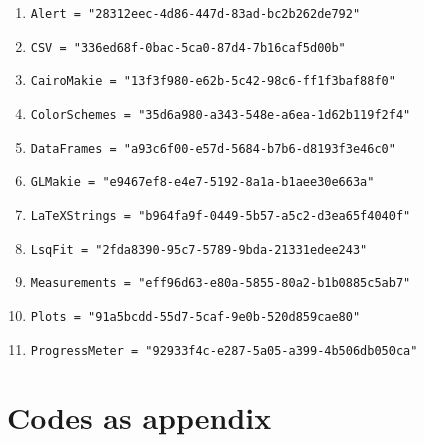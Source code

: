 
\begin{enumerate}
    \item \verb+Alert = "28312eec-4d86-447d-83ad-bc2b262de792"+
    \item \verb+CSV = "336ed68f-0bac-5ca0-87d4-7b16caf5d00b"+
    \item \verb+CairoMakie = "13f3f980-e62b-5c42-98c6-ff1f3baf88f0"+ \cite{MakieJL}
    \item \verb+ColorSchemes = "35d6a980-a343-548e-a6ea-1d62b119f2f4"+
    \item \verb+DataFrames = "a93c6f00-e57d-5684-b7b6-d8193f3e46c0"+ \cite{DataFramesJL}
    \item \verb+GLMakie = "e9467ef8-e4e7-5192-8a1a-b1aee30e663a"+ \cite{MakieJL}
    \item \verb+LaTeXStrings = "b964fa9f-0449-5b57-a5c2-d3ea65f4040f"+
    \item \verb+LsqFit = "2fda8390-95c7-5789-9bda-21331edee243"+
    \item \verb+Measurements = "eff96d63-e80a-5855-80a2-b1b0885c5ab7"+ \cite{Measurements.jl-2016}
    \item \verb+Plots = "91a5bcdd-55d7-5caf-9e0b-520d859cae80"+ \cite{PlotsJL}
    \item \verb+ProgressMeter = "92933f4c-e287-5a05-a399-4b506db050ca"+
\end{enumerate}

\section{Codes as appendix}

